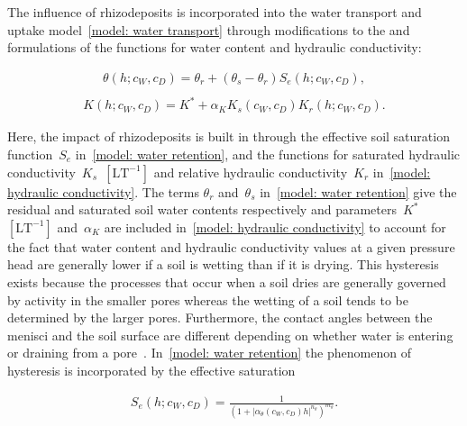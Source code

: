 \documentclass[11pt,a4paper]{article}
\numberwithin{equation}{section}
\begin{document}
The influence of rhizodeposits is incorporated into the water transport and uptake model~\eqref{model: water transport} through modifications to the \cite{van1980closed} and \cite{mualem1976new} formulations of the functions for water content and hydraulic conductivity:
\begin{linenomath*}
	\begin{equation}\label{model: water retention}
		\begin{aligned}
			\theta(h; c_W, c_D) = \theta_r + (\theta_s-\theta_r)S_e(h; c_W, c_D),\\
		\end{aligned}
	\end{equation}
	\begin{equation}\label{model: hydraulic conductivity}
		\begin{aligned}
			K(h; c_W, c_D) = K^* + \alpha_KK_s(c_W, c_D)K_r(h; c_W, c_D).
		\end{aligned}	
	\end{equation}		
\end{linenomath*}
Here, the impact of rhizodeposits is built in through the effective soil saturation function~$S_e$ in~\eqref{model: water retention}, and the functions for saturated hydraulic conductivity~$K_s$~$[\text{LT}^{-1}]$ and relative hydraulic conductivity~$K_r$ in~\eqref{model: hydraulic conductivity}. The terms $\theta_r$ and~$\theta_s$ in~\eqref{model: water retention} give the residual and saturated soil water contents respectively and parameters~$K^*$~$[\text{LT}^{-1}]$ and~$\alpha_K$ are included in~\eqref{model: hydraulic conductivity} to account for the fact that 
water content and hydraulic conductivity values at a given pressure head are generally lower if a soil is wetting than if it is drying. This hysteresis exists because the processes that occur when a soil dries are generally governed by activity in the smaller pores whereas the wetting of a soil tends to be determined by the larger pores. Furthermore, the contact angles between the menisci and the soil surface are different depending on whether water is entering or draining from a pore~\citep{van2011hydraulic, zhou2013contact}. In~\eqref{model: water retention} the phenomenon of hysteresis is incorporated by the effective saturation
\begin{linenomath*}
	\begin{equation}\label{model: effective saturation}
		\begin{aligned}
			S_e(h;c_W, c_D)=\frac{1}{(1+|\alpha_{\theta}(c_W, c_D) h|^{n_{\theta}})^{m_{\theta}}}.
		\end{aligned}
	\end{equation}  
\end{linenomath*}
\end{document}
